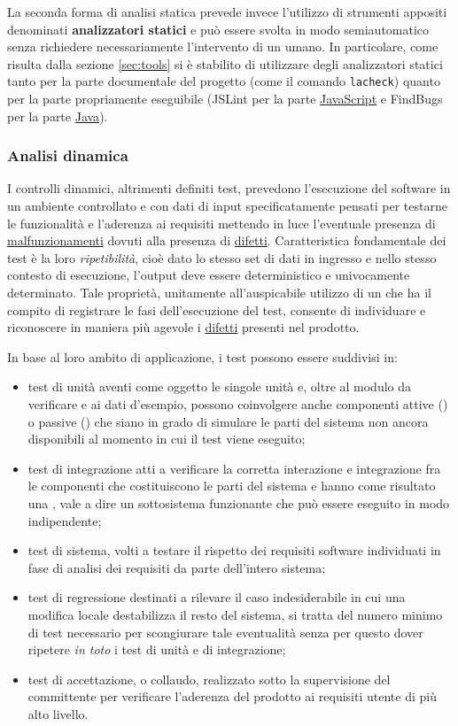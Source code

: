La seconda forma di analisi statica prevede invece l'utilizzo di strumenti appositi denominati \textbf{analizzatori statici} e può essere svolta in modo semiautomatico senza richiedere necessariamente l'intervento di un umano. In particolare, come risulta dalla sezione \ref{sec:tools} si è stabilito di utilizzare degli analizzatori statici tanto per la parte documentale del progetto (come il comando \texttt{lacheck}) quanto per la parte propriamente eseguibile (JSLint per la parte \underline{JavaScript} e FindBugs per la parte \underline{Java}).

\subsubsection{Analisi dinamica}
I controlli dinamici, altrimenti definiti test, prevedono l'esecuzione del software in un ambiente controllato e con dati di input specificatamente pensati per testarne le funzionalità e l'aderenza ai requisiti mettendo in luce l'eventuale presenza di \underline{malfunzionamenti} dovuti alla presenza di \underline{difetti}. Caratteristica fondamentale dei test è la loro \emph{ripetibilità}, cioè dato lo stesso set di dati in ingresso e nello stesso contesto di esecuzione, l'output deve essere deterministico e univocamente determinato. Tale proprietà, unitamente all'auspicabile utilizzo di un  che ha il compito di registrare le fasi dell'esecuzione del test, consente di individuare e riconoscere in maniera più agevole i \underline{difetti} presenti nel prodotto.

In base al loro ambito di applicazione, i test possono essere suddivisi in:
\begin{itemize}
  \item test di unità aventi come oggetto le singole unità e, oltre al modulo da verificare e ai dati d'esempio, possono coinvolgere anche componenti attive () o passive () che siano in grado di simulare le parti del sistema non ancora disponibili al momento in cui il test viene eseguito;
  \item test di integrazione atti a verificare la corretta interazione e integrazione fra le componenti che costituiscono le parti del sistema e hanno come risultato una , vale a dire un sottosistema funzionante che può essere eseguito in modo indipendente;
  \item test di sistema, volti a testare il rispetto dei requisiti software individuati in fase di analisi dei requisiti da parte dell'intero sistema; 
  \item test di regressione destinati a rilevare il caso indesiderabile in cui una modifica locale destabilizza il resto del sistema, si tratta del numero minimo di test necessario per scongiurare tale eventualità senza per questo dover ripetere \emph{in toto} i test di unità e di integrazione;
  \item test di accettazione, o collaudo, realizzato sotto la supervisione del committente per verificare l'aderenza del prodotto ai requisiti utente di più alto livello.
\end{itemize}

